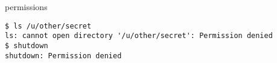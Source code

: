 \begin{frame}[fragile]{permissions}
\begin{Verbatim}
$ ls /u/other/secret
ls: cannot open directory '/u/other/secret': Permission denied
$ shutdown
shutdown: Permission denied
\end{Verbatim}
\end{frame}
